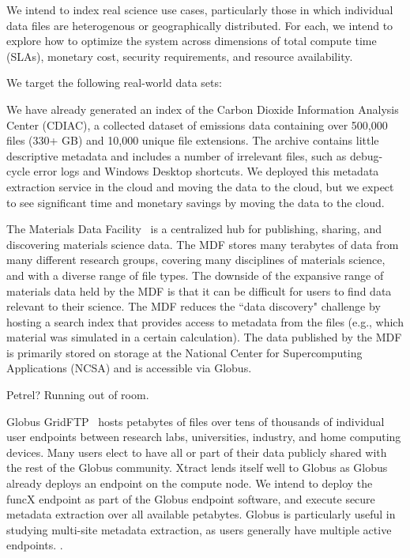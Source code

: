 \documentclass[sigconf]{acmart}
\newcommand{\tyler}[1]{}
\newcommand{\tyler}[1]{{\textcolor{cyan}{ tyler: #1 }}}
\begin{document}
We intend to index real science use cases, particularly those in which individual data files are heterogenous 
or geographically distributed. For each, we intend to explore how to optimize the system across dimensions of 
total compute time (SLAs), monetary cost, security requirements, and resource availability.

We target the following real-world data sets: 

We have already generated an index of the Carbon Dioxide Information Analysis Center (CDIAC), a collected dataset of 
emissions data containing over 500,000 files (330+ GB) and 10,000 unique file extensions. The archive contains little 
descriptive metadata and includes a number of irrelevant files, such as debug-cycle error logs and Windows Desktop 
shortcuts.  We deployed this metadata extraction service in the cloud and moving the data to the cloud, but we expect 
to see significant time and monetary savings by moving the data to the cloud.  

The Materials Data Facility~\cite{blaiszik2016materials, blaiszik2019mdf}
is a centralized hub for publishing, sharing, and discovering materials science data. 
The MDF stores many terabytes of data from many different research groups, covering many disciplines of 
materials science, and with a diverse range of file types.
The downside of the expansive range of materials data held by the MDF 
is that it can be difficult for users to find data relevant to their science.
The MDF reduces the ``data discovery" challenge by hosting a search index that provides access to metadata from the 
files (e.g., which material was simulated in a certain calculation).
The data published by the MDF is primarily stored on storage at the National Center for Supercomputing Applications
(NCSA) and is accessible via Globus.  

Petrel? Running out of room. 

Globus GridFTP~\cite{ananthakrishnan2018globus} hosts petabytes of files over tens of thousands of individual user endpoints between research labs, 
universities, industry, and home computing devices. Many \tyler{???} users elect to have all or part of their data publicly 
shared with the rest of the Globus community. Xtract lends itself well to Globus as Globus already deploys an 
endpoint on the compute node.  We intend to deploy the funcX endpoint as part of the Globus endpoint software, and 
execute secure metadata extraction over all available petabytes. Globus is particularly useful in studying multi-site 
metadata extraction, as users generally have multiple active endpoints. \tyler{more detail}. 
\end{document}
